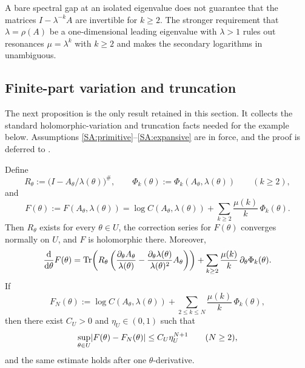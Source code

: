 \begin{remark}
  \label{rem:expansive-hypothesis-needed}
  A bare spectral gap at an isolated eigenvalue does not guarantee that
  the matrices \(I-\lambda^{-k}A\) are invertible for \(k\ge 2\). The
  stronger requirement that \(\lambda=\rho(A)\) be a one-dimensional
  leading eigenvalue with \(\lambda>1\) rules out resonances
  \(\mu=\lambda^k\) with \(k\ge 2\) and makes the secondary logarithms
  in  unambiguous.
\end{remark}

\subsection{Finite-part variation and truncation}

The next proposition is the only result retained in this section. It
collects the standard holomorphic-variation and truncation facts needed
for the example below. Assumptions \ref{SA:primitive}--\ref{SA:expansive}
are in force, and the proof is deferred to
.

\begin{proposition}
  \label{prop:finite-part-illustration}
  Define
  \[
    R_\theta:=\bigl(I-A_\theta/\lambda(\theta)\bigr)^{\#},
    \qquad
    \Phi_k(\theta):=\Phi_k(A_\theta,\lambda(\theta))
    \qquad (k\ge 2),
  \]
  and
  \[
    F(\theta):=F(A_\theta,\lambda(\theta))
    =\log C(A_\theta,\lambda(\theta))
      +\sum_{k\ge 2}\frac{\mu(k)}{k}\,\Phi_k(\theta).
  \]
  Then \(R_\theta\) exists for every \(\theta\in U\), the correction
  series for \(F(\theta)\) converges normally on \(U\), and \(F\) is
  holomorphic there. Moreover,
  \[
    \frac{\mathop{}\!\mathrm{d}}{\mathop{}\!\mathrm{d}\theta}F(\theta)
    =\operatorname{Tr}\!\left(
      R_\theta\left(
        \frac{\partial_\theta A_\theta}{\lambda(\theta)}
        -\frac{\partial_\theta\lambda(\theta)}{\lambda(\theta)^2}
         A_\theta\right)\right)
    +\sum_{k\ge 2}\frac{\mu(k)}{k}\,\partial_\theta\Phi_k(\theta).
  \]
  If
  \[
    F_N(\theta)
    :=\log C(A_\theta,\lambda(\theta))
      +\sum_{2\le k\le N}\frac{\mu(k)}{k}\,\Phi_k(\theta),
  \]
  then there exist \(C_U>0\) and \(\eta_U\in(0,1)\) such that
  \[
    \sup_{\theta\in U}\lvert F(\theta)-F_N(\theta) \rvert
    \le C_U\eta_U^{N+1}
    \qquad (N\ge 2),
  \]
  and the same estimate holds after one \(\theta\)-derivative.
\end{proposition}

